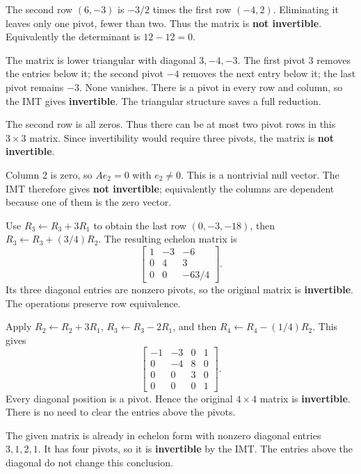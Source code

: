 The second row $(6,-3)$ is $-3/2$ times the first row $(-4,2)$.
Eliminating it leaves only one pivot, fewer than two. Thus the matrix is
\textbf{not invertible}. Equivalently the determinant is $12-12=0$.

The matrix is lower triangular with diagonal $3,-4,-3$.
The first pivot $3$ removes the entries below it; the second pivot $-4$
removes the next entry below it; the last pivot remains $-3$. None vanishes.
There is a pivot in every row and column, so the IMT gives
\textbf{invertible}. The triangular structure saves a full reduction.

The second row is all zeros. Thus there can be at most two pivot rows in
this $3\times3$ matrix. Since invertibility would require three pivots,
the matrix is \textbf{not invertible}.

Column 2 is zero, so $Ae_2=0$ with $e_2\ne0$. This is a nontrivial
null vector. The IMT therefore gives \textbf{not invertible}; equivalently
the columns are dependent because one of them is the zero vector.

Use $R_3\gets R_3+3R_1$ to obtain the last row $(0,-3,-18)$,
then $R_3\gets R_3+(3/4)R_2$. The resulting echelon matrix is
\[
 \begin{bmatrix}1&-3&-6\\0&4&3\\0&0&-63/4\end{bmatrix}.
\]
Its three diagonal entries are nonzero pivots, so the original matrix is
\textbf{invertible}. The operations preserve row equivalence.

Apply $R_2\gets R_2+3R_1$, $R_3\gets R_3-2R_1$, and then
$R_4\gets R_4-(1/4)R_2$. This gives
\[
 \begin{bmatrix}-1&-3&0&1\\0&-4&8&0\\0&0&3&0\\0&0&0&1\end{bmatrix}.
\]
Every diagonal position is a pivot. Hence the original $4\times4$ matrix
is \textbf{invertible}. There is no need to clear the entries above the pivots.

The given matrix is already in echelon form with nonzero diagonal entries
$3,1,2,1$. It has four pivots, so it is \textbf{invertible} by the IMT.
The entries above the diagonal do not change this conclusion.

